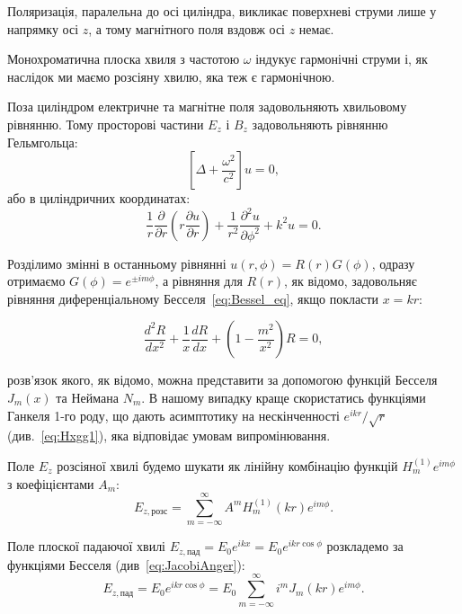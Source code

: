 \begin{problem}
\begin{solution}
	Поляризація, паралельна до осі циліндра, викликає поверхневі струми лише у напрямку осі $z$, а тому магнітного поля вздовж осі $z$ немає.
%

	Монохроматична плоска хвиля з частотою $\omega$ індукує  гармонічні струми і, як наслідок ми маємо розсіяну хвилю, яка теж є гармонічною.

	Поза циліндром електричне та магнітне поля задовольняють хвильовому рівнянню.
	Тому просторові частини $E_z$ і $B_z$ задовольняють рівнянню Гельмгольца:
	\[
		\left[ \Delta + \frac{\omega^2}{c^2}\right] u = 0,
	\]
	або в циліндричних координатах:
	\[
		\frac1r \frac{\partial }{\partial r}
		\left( r \frac{\partial u}{\partial r} \right) + \frac{1}{r^2} \frac{\partial^2 u}{\partial \phi^2} + k^2 u = 0.
	\]

	Розділимо змінні в останньому рівнянні $u(r,\phi) = R(r)G(\phi)$, одразу отримаємо $G(\phi) = e^{\pm im\phi}$, а рівняння для $R(r)$, як відомо, задовольняє рівняння диференціальному Бесселя~\eqref{eq:Bessel_eq}, якщо покласти $x = kr$:

\begin{equation}\label{eq:BessProblem}\tag{*}
		\frac{d^2R}{dx^2} + \frac1x\frac{dR}{dx} + \left(1 - \frac{m^2}{x^2} \right) R = 0,
\end{equation}

	розв'язок якого, як відомо, можна представити за допомогою функцій Бесселя $J_m(x)$ та Неймана $N_m$. 
    В нашому випадку краще скористатись функціями Ганкеля 1-го роду, що дають асимптотику на нескінченності $e^{ikr}/\sqrt{r}$ (див.~\eqref{eq:Hxgg1}), яка відповідає умовам випромінювання.
    
    Поле  $E_z$ розсіяної хвилі будемо шукати як  лінійну комбінацію функцій $H_m^{(1)}e^{im\phi}$ з коефіцієнтами $A_m$:
	\[
		E_{z,\text{розс}} =  \sum\limits_{m = -\infty}^{\infty} A^m H^{(1)}_m(k r)e^{im\phi}.
	\]

	Поле плоскої падаючої хвилі $ E_{z,\text{пад}} = E_0e^{ikx} = E_0e^{ikr\cos\phi}$ розкладемо за функціями Бесселя (див~\eqref{eq:JacobiAnger}):
	\[
		E_{z,\text{пад}} =  E_0e^{ikr\cos\phi} =  E_0 \sum\limits_{m = -\infty}^{\infty} i^m J_m(k r)e^{im\phi}.
	\]


\end{solution}
\end{problem}
